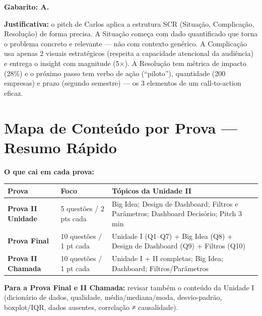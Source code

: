 \begin{SolvedBox}
\medskip
\textbf{Gabarito: A.}

\textbf{Justificativa:} o pitch de Carlos aplica a estrutura SCR (Situação, Complicação,
Resolução) de forma precisa. A Situação começa com dado quantificado que torna o problema
concreto e relevante — não com contexto genérico. A Complicação usa apenas 2 visuais
estratégicos (respeita a capacidade atencional da audiência) e entrega o insight com
magnitude (5$\times$). A Resolução tem métrica de impacto (28\%) e o próximo passo tem
verbo de ação (``piloto''), quantidade (200 empresas) e prazo (segundo semestre) —
os 3 elementos de um call-to-action eficaz.
\end{SolvedBox}

\section{Mapa de Conteúdo por Prova — Resumo Rápido}

\begin{BoardBox}
\textbf{O que cai em cada prova:}

\begin{tabular}{|l|p{4cm}|p{7cm}|}
\hline
\textbf{Prova} & \textbf{Foco} & \textbf{Tópicos da Unidade II} \\
\hline
\textbf{Prova II Unidade} & 5 questões / 2 pts cada & Big Idea; Design de Dashboard; Filtros e Parâmetros;
Dashboard Decisório; Pitch 3 min \\
\hline
\textbf{Prova Final} & 10 questões / 1 pt cada & Unidade I (Q1–Q7) + Big Idea (Q8) +
Design de Dashboard (Q9) + Filtros (Q10) \\
\hline
\textbf{Prova II Chamada} & 10 questões / 1 pt cada & Unidade I + II completas;
Big Idea; Dashboard; Filtros/Parâmetros \\
\hline
\end{tabular}

\textbf{Para a Prova Final e II Chamada:} revisar também o conteúdo da Unidade I
(dicionário de dados, qualidade, média/mediana/moda, desvio-padrão, boxplot/IQR,
dados ausentes, correlação ≠ causalidade).
\end{BoardBox}

